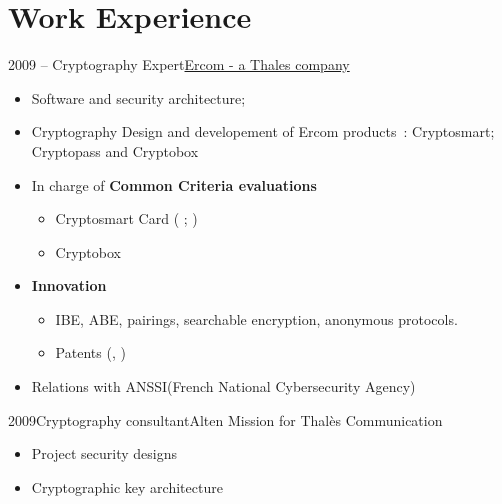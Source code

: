 \documentclass[a4paper]{customcv}
\begin{document}
\makeprofile
\section{Work Experience}

\begin{cventry}{2009 -- }{Cryptography Expert}{\href{https://www.ercom.fr/}{Ercom - a Thales company}}
  \begin{itemize}
    \item Software and security architecture;
    \item Cryptography Design and developement of Ercom products~:\linebreak
          Cryptosmart; Cryptopass and Cryptobox
    \item In charge of \textbf{Common Criteria evaluations}
          \begin{itemize}
            \item Cryptosmart Card (\cite{anssi.2012/71} ; \cite{anssi.2016/69})
            \item Cryptobox \cite{anssi.2018/23}
          \end{itemize}
    \item \textbf{Innovation}
          \begin{itemize}
            \item IBE, ABE, pairings, searchable encryption, anonymous protocols.
            \item Patents (\cite{pat.save}, \cite{pat.card.auth})
          \end{itemize}
    \item Relations with ANSSI(French National Cybersecurity Agency)
  \end{itemize}
\end{cventry}

\begin{cventry}{2009}{Cryptography consultant}{Alten}
  Mission for Thalès Communication
  \begin{itemize}
    \item Project security designs
    \item Cryptographic key architecture
  \end{itemize}
\end{cventry}
\end{document}

